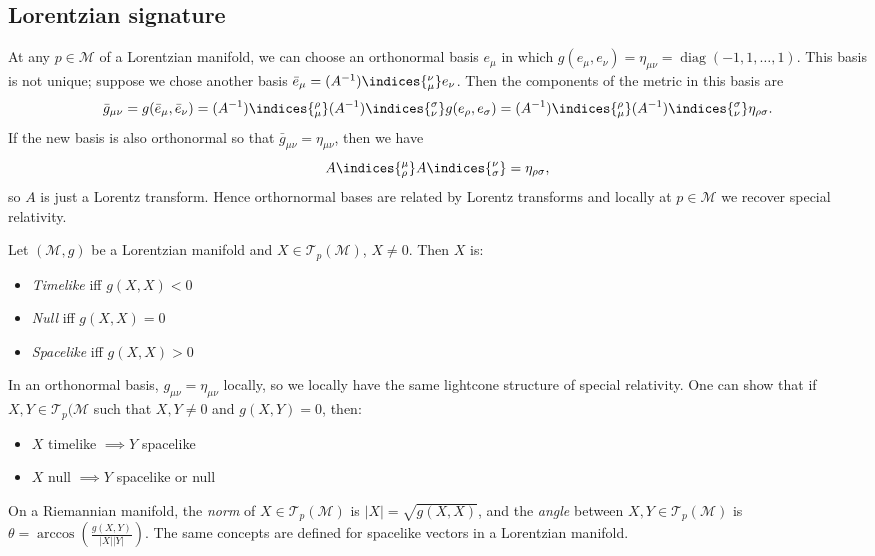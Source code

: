 \documentclass{jknotes}
\begin{document}
\subsection{Lorentzian signature}
At any \(p\in\mathcal{M}\) of a Lorentzian manifold, we can choose an orthonormal basis \(e_\mu\) in which \(g(e_\mu,e_\nu) = \eta_{\mu\nu} = \operatorname{diag}(-1,1,\dots,1)\). This basis is not unique; suppose we chose another basis \(\bar{e}_\mu = (A^{-1})\indices{^\nu_\mu}e_\nu\). Then the components of the metric in this basis are
\begin{equation}
    \bar{g}_{\mu\nu} = g(\bar{e}_\mu,\bar{e}_\nu) = (A^{-1})\indices{^\rho_\mu}(A^{-1})\indices{^\sigma_\nu}g(e_\rho,e_\sigma) = (A^{-1})\indices{^\rho_\mu}(A^{-1})\indices{^\sigma_\nu} \eta_{\rho\sigma}.
\end{equation}
If the new basis is also orthonormal so that \(\bar{g}_{\mu\nu} = \eta_{\mu\nu}\), then we have
\begin{equation}
    A\indices{^\mu_\rho}A\indices{^\nu_\sigma} = \eta_{\rho\sigma},
\end{equation}
so \(A\) is just a Lorentz transform. Hence orthornormal bases are related by Lorentz transforms and locally at \(p\in \mathcal{M}\) we recover special relativity.
\begin{defn}
    Let \((\mathcal{M},g)\) be a Lorentzian manifold and \(X\in\mathcal{T}_p(\mathcal{M})\), \(X\ne0\). Then \(X\) is:
    \begin{itemize}
        \item \emph{Timelike} iff \(g(X,X) < 0\)
        \item \emph{Null} iff \(g(X,X)=0\)
        \item \emph{Spacelike} iff \(g(X,X) > 0\)
    \end{itemize}
\end{defn}
In an orthonormal basis, \(g_{\mu\nu} = \eta_{\mu\nu}\) locally, so we locally have the same lightcone structure of special relativity. One can show that if \(X,Y\in\mathcal{T}_p(\mathcal{M}\) such that \(X,Y \ne 0\) and \(g(X,Y)=0\), then:
\begin{itemize}
    \item \(X\) timelike \(\implies Y\) spacelike
    \item \(X\) null \(\implies Y\) spacelike or null
\end{itemize}

\begin{defn}
    On a Riemannian manifold, the \emph{norm} of \(X\in\mathcal{T}_p(\mathcal{M})\) is \(|X| = \sqrt{g(X,X)}\), and the \emph{angle} between \(X,Y\in\mathcal{T}_p(\mathcal{M})\) is \(\theta = \arccos\left(\frac{g(X,Y)}{|X||Y|}\right)\). The same concepts are defined for spacelike vectors in a Lorentzian manifold.
\end{defn}
\end{document}
